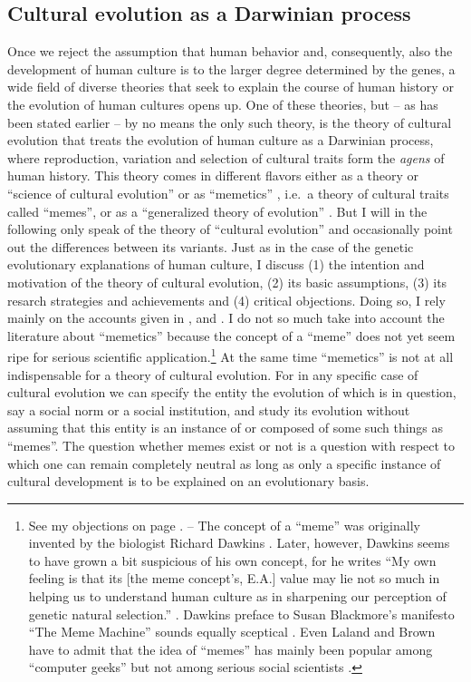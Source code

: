 \subsection{Cultural evolution as a Darwinian process}
\label{memeticalEvolution}
Once we reject the assumption that human behavior and, consequently, also the
development of human culture is to the larger degree determined by the genes,
a wide field of diverse theories that seek to explain the course of human
history or the evolution of human cultures opens up.  One of these theories,
but -- as has been stated earlier -- by no means the only such theory, is the
theory of cultural evolution that treats the evolution of human culture as a
Darwinian process, where reproduction, variation and selection of cultural
traits form the {\em agens} of human history. This theory comes in different
flavors either as a theory or ``science of cultural evolution''
\cite[]{mesoudi-laland-whiten:2006} or as ``memetics''
\cite[]{blackmore:1999}, i.e.\ a theory of cultural traits called ``memes'', or
as a ``generalized theory of evolution'' \cite[]{schurz:2001}. But I will in the
following only speak of the theory of ``cultural evolution'' and occasionally
point out the differences between its variants. Just as in the case of the
genetic evolutionary explanations of human culture, I discuss (1) the
intention and motivation of the theory of cultural evolution, (2) its basic
assumptions, (3) its resarch strategies and achievements and (4) critical
objections. Doing so, I rely mainly on the accounts given in
\cite[]{mesoudi-laland-whiten:2006}, \cite[]{schurz:2001} and
\cite[]{laland-brown:2004}. I do not so much take into account the
literature about ``memetics'' because the concept of a ``meme'' does not yet
seem ripe for serious scientific application.\footnote{See my objections on
  page \pageref{drawbacksOfMemetics}. -- The concept of a ``meme'' was
  originally invented by the biologist Richard Dawkins \cite[p.\ 
  304-322.]{dawkins:1976}. Later, however, Dawkins seems to have grown a bit
  suspicious of his own concept, for he writes ``My own feeling is that its
  [the meme concept's, E.A.] value may lie not so much in helping us to
  understand human culture as in sharpening our perception of genetic natural
  selection.'' \cite[p.\ 112]{dawkins:1982}. Dawkins preface to Susan
  Blackmore's manifesto ``The Meme Machine'' sounds equally sceptical \cite[p.\ 
  7-21.]{blackmore:1999}. Even Laland and Brown have to admit that the idea of
  ``memes'' has mainly been popular among ``computer geeks'' but not among
  serious social scientists \cite[p.\ 200]{laland-brown:2004}.} At the same
time ``memetics'' is not at all indispensable for a theory of cultural
evolution. For in any specific case of cultural evolution we can specify the
entity the evolution of which is in question, say a social norm or a social
institution, and study its evolution without assuming that this entity is an
instance of or composed of some such things as ``memes''. The question whether
memes exist or not is a question with respect to which one can remain
completely neutral as long as only a specific instance of cultural development
is to be explained on an evolutionary basis.

